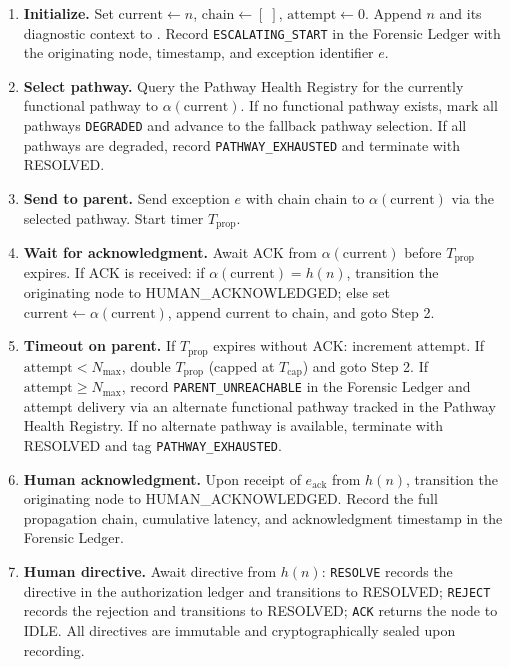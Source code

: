 \begin{enumerate}
    \item \textbf{Initialize.} Set $\text{current} \leftarrow n$, $\text{chain} \leftarrow [\;]$, $\text{attempt} \leftarrow 0$. Append $n$ and its diagnostic context to . Record \texttt{ESCALATING\_START} in the Forensic Ledger with the originating node, timestamp, and exception identifier $e$.

    \item \textbf{Select pathway.} Query the Pathway Health Registry for the currently functional pathway to $\alpha(\text{current})$. If no functional pathway exists, mark all pathways \texttt{DEGRADED} and advance to the fallback pathway selection. If all pathways are degraded, record \texttt{PATHWAY\_EXHAUSTED} and terminate with RESOLVED.

    \item \textbf{Send to parent.} Send exception $e$ with chain $\text{chain}$ to $\alpha(\text{current})$ via the selected pathway. Start timer $T_{\text{prop}}$.

    \item \textbf{Wait for acknowledgment.} Await ACK from $\alpha(\text{current})$ before $T_{\text{prop}}$ expires. If ACK is received: if $\alpha(\text{current}) = h(n)$, transition the originating node to HUMAN\_ACKNOWLEDGED; else set $\text{current} \leftarrow \alpha(\text{current})$, append $\text{current}$ to $\text{chain}$, and goto Step 2.

    \item \textbf{Timeout on parent.} If $T_{\text{prop}}$ expires without ACK: increment $\text{attempt}$. If $\text{attempt} < N_{\max}$, double $T_{\text{prop}}$ (capped at $T_{\text{cap}}$) and goto Step 2. If $\text{attempt} \geq N_{\max}$, record \texttt{PARENT\_UNREACHABLE} in the Forensic Ledger and attempt delivery via an alternate functional pathway tracked in the Pathway Health Registry. If no alternate pathway is available, terminate with RESOLVED and tag \texttt{PATHWAY\_EXHAUSTED}.

    \item \textbf{Human acknowledgment.} Upon receipt of $e_{\text{ack}}$ from $h(n)$, transition the originating node to HUMAN\_ACKNOWLEDGED. Record the full propagation chain, cumulative latency, and acknowledgment timestamp in the Forensic Ledger.

    \item \textbf{Human directive.} Await directive from $h(n)$: \texttt{RESOLVE} records the directive in the authorization ledger and transitions to RESOLVED; \texttt{REJECT} records the rejection and transitions to RESOLVED; \texttt{ACK} returns the node to IDLE. All directives are immutable and cryptographically sealed upon recording.
\end{enumerate}

